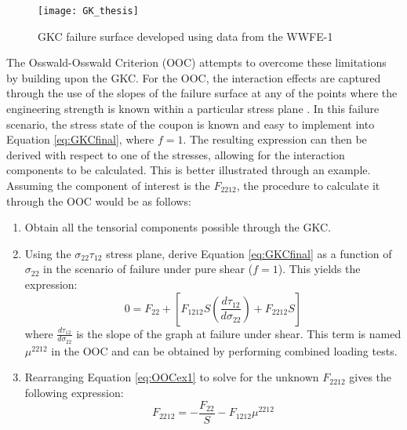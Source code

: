 \documentclass[main.tex]{subfiles}
\begin{document}
\begin{figure}[h]
	\center
	\texttt{[image: GK\_thesis]}
	\caption{GKC failure surface developed using data from the WWFE-1} \label{fig:GKClimit}
\end{figure}

The Osswald-Osswald Criterion (OOC) attempts to overcome these limitations by building upon the GKC. For the OOC, the interaction effects are captured through the use of the slopes of the failure surface at any of the points where the engineering strength is known within a particular stress plane \cite{Osswald2017a}. In this failure scenario, the stress state of the coupon is known and easy to implement into Equation \ref{eq:GKCfinal}, where $f=1$. The resulting expression can then be derived with respect to one of the stresses, allowing for the interaction components to be calculated. This is better illustrated through an example. Assuming the component of interest is the $F_{2212}$, the procedure to calculate it through the OOC would be as follows:

\pagebreak
\begin{enumerate}
	\item Obtain all the tensorial components possible through the GKC.
	\item Using the $\sigma_{22}$\textendash$\tau_{12}$ stress plane, derive Equation \ref{eq:GKCfinal} as a function of $\sigma_{22}$ in the scenario of failure under pure shear ($f=1$). This yields the expression:
	\begin{equation} \label{eq:OOCex1}
	 0= F_{22}+[F_{1212}S(\frac{d\tau_{12}}{d\sigma_{22}})+F_{2212}S]
	\end{equation}
	 where $\frac{d\tau_{12}}{d\sigma_{22}}$  is the slope of the graph at failure under shear. This term is named $\mu^{2212}$ in the OOC and can be obtained by performing combined loading tests.
	\item Rearranging Equation \ref{eq:OOCex1} to solve for the unknown $F_{2212}$ gives the following expression:
	\begin{equation} \label{eq:OOCex2}
	F_{2212}=-\frac{F_{22}}{S}-F_{1212}\mu^{2212}
	\end{equation}
\end{enumerate}

% 
% 

\end{document}
